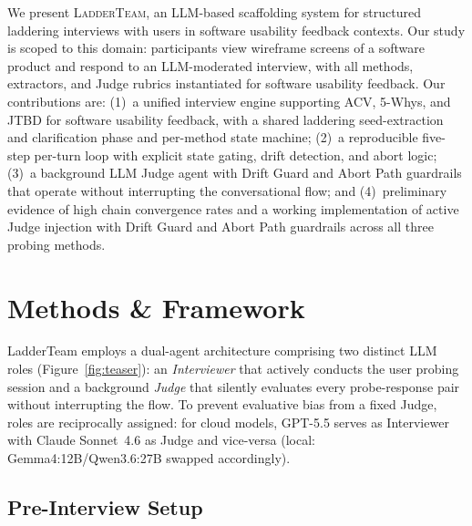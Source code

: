 \documentclass[sigconf,authordraft]{acmart}
\begin{document}
We present \textsc{LadderTeam}, an LLM-based scaffolding system for structured laddering interviews with users in software usability feedback contexts. Our study is scoped to this domain: participants view wireframe screens of a software product and respond to an LLM-moderated interview, with all methods, extractors, and Judge rubrics instantiated for software usability feedback. Our contributions are: 
(1)~a unified interview engine supporting ACV, 5-Whys, and JTBD for software usability
feedback, with a shared laddering seed-extraction and clarification phase and per-method state machine;
(2)~a reproducible five-step per-turn loop with explicit state gating, drift detection, and abort logic;
(3)~a background LLM Judge agent with Drift Guard and Abort Path guardrails that operate
without interrupting the conversational flow; and
(4)~preliminary evidence of high chain convergence rates and a working implementation of active Judge injection with Drift Guard and Abort Path guardrails across all three probing methods.

\section{Methods \& Framework}

LadderTeam employs a dual-agent architecture comprising two distinct LLM roles (Figure~\ref{fig:teaser}): an \emph{Interviewer} that actively conducts the user probing session and a background \emph{Judge} that silently evaluates every probe-response pair without interrupting the flow. To prevent evaluative bias from a fixed Judge, roles are reciprocally assigned: for cloud models, GPT-5.5 serves as Interviewer with Claude Sonnet~4.6 as Judge and vice-versa (local: Gemma4:12B/Qwen3.6:27B swapped accordingly).

\subsection{Pre-Interview Setup}
\end{document}
